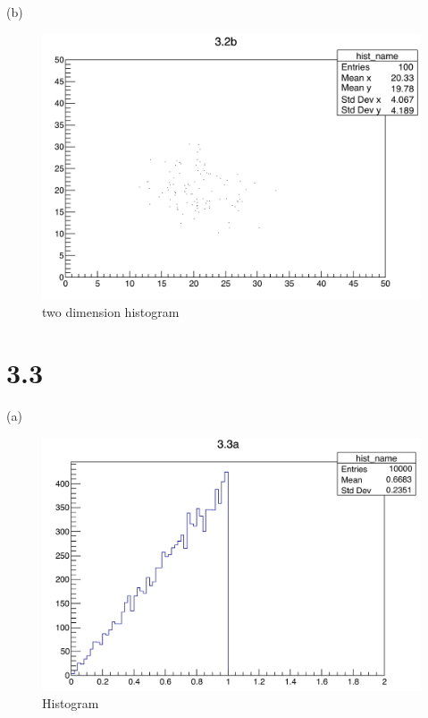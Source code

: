 \documentclass{article}
\begin{document}
\begin{CJK*}{GBK}{song}
(b)
\begin{figure}[H]
\centerline{\includegraphics[scale=0.4]{3.2b.png}}
\caption{two dimension histogram}
\label{fig:label}
\end{figure}


\section{3.3}
(a)
\begin{figure}[H]
\centerline{\includegraphics[scale=0.4]{3.3a.png}}
\caption{Histogram}
\label{fig:label}
\end{figure}



\end{CJK*}
\end{document}
